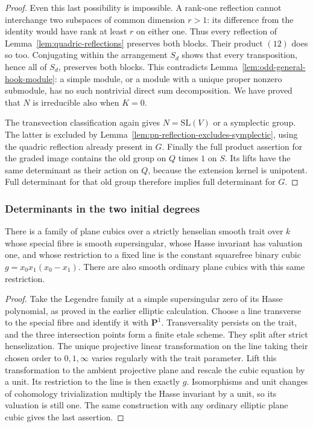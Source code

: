 \begin{proof}
Even this last possibility is impossible.  A rank-one reflection
cannot interchange two subspaces of common dimension $r>1$:
its difference from the identity would have rank at least $r$
on either one.  Thus every reflection of
Lemma~\ref{lem:quadric-reflections} preserves both blocks.
Their product $(12)$ does so too.  Conjugating within the
arrangement $S_d$ shows that every transposition, hence all
of $S_d$, preserves both blocks.  This contradicts
Lemma~\ref{lem:odd-general-hook-module}: a simple module, or a
module with a unique proper nonzero submodule, has no such
nontrivial direct sum decomposition.  We have proved that
$N$ is irreducible also when $K=0$.

The transvection classification again gives $N=\mathrm{SL}(V)$
or a symplectic group.  The latter is excluded by
Lemma~\ref{lem:pn-reflection-excludes-symplectic}, using the
quadric reflection already present in $G$.
Finally the full product assertion for the graded image
contains the old group on $Q$ times $1$ on $S$.  Its lifts
have the same determinant as their action on $Q$, because
the extension kernel is unipotent.  Full determinant for
that old group therefore implies full determinant for $G$.
\end{proof}

\subsubsection{Determinants in the two initial degrees}

\begin{lemma}\label{lem:elliptic-fixed-three-points}
There is a family of plane cubics over a strictly henselian
smooth trait over $k$ whose special fibre is smooth supersingular,
whose Hasse invariant has valuation one, and whose restriction
to a fixed line is the constant squarefree binary cubic
$g=x_0x_1(x_0-x_1)$.  There are also smooth ordinary plane
cubics with this same restriction.
\end{lemma}

\begin{proof}
Take the Legendre family at a simple supersingular zero of its
Hasse polynomial, as proved in the earlier elliptic calculation.
Choose a line transverse to the special fibre and identify it
with $\mathbf P^1$.  Transversality persists on the trait, and
the three intersection points form a finite etale scheme.
They split after strict henselization.  The unique projective
linear transformation on the line taking their chosen order
to $0,1,\infty$ varies regularly with the trait parameter.
Lift this transformation to the ambient projective plane and
rescale the cubic equation by a unit.  Its restriction to the
line is then exactly $g$.  Isomorphisms and unit changes of
cohomology trivialization multiply the Hasse invariant by a
unit, so its valuation is still one.  The same construction
with any ordinary elliptic plane cubic gives the last assertion.
\end{proof}

